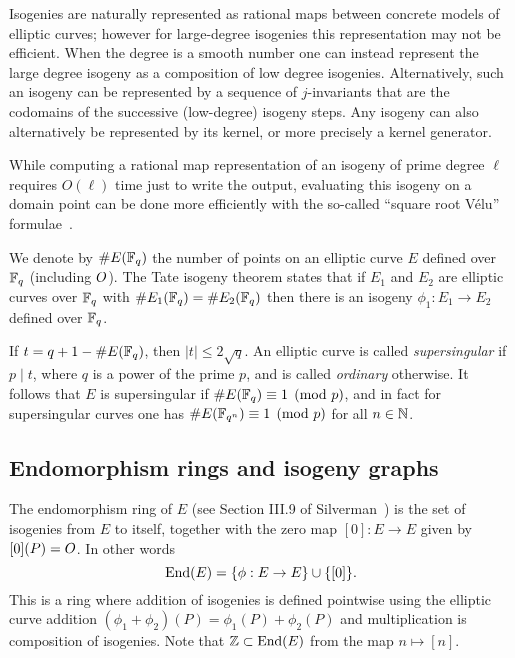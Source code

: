 Isogenies are naturally represented as rational maps between concrete models of elliptic curves; however for large-degree isogenies this representation may not be efficient. When the degree is a smooth number one can instead represent the large degree isogeny as a composition of low degree isogenies.
Alternatively, such an isogeny can be represented by a sequence of $j$-invariants that are the codomains of the successive (low-degree) isogeny steps. 
%
Any isogeny can also alternatively be represented by its kernel, or more precisely a kernel generator. 
%

While computing a rational map representation of an isogeny of prime degree $\ell$ requires $O(\ell)$ time just to write the output, evaluating this isogeny on a domain point can be done more efficiently with the so-called ``square root Vélu'' formulae~\cite{velusqrt}. %



We denote by $\# E( \mathbb{F}_q )$ the number of points on an elliptic curve $E$ defined over $\mathbb{F}_q$ (including $O$).
The Tate isogeny theorem  states that if $E_1$ and $E_2$ are elliptic curves over $\mathbb{F}_q$ with $\#E_1(\mathbb{F}_q) = \#E_2(\mathbb{F}_q)$ then there is an isogeny $\phi_1 : E_1 \rightarrow E_2$ defined over $\mathbb{F}_q$.


If $t = q + 1 - \#E(\mathbb{F}_q )$, then $|t| \le 2 \sqrt{q}$.
An elliptic curve is called \emph{supersingular} if $p \mid t$, where $q$ is a power of the prime $p$, and is called \emph{ordinary} otherwise.
It follows that $E$ is supersingular if $\#E(\mathbb{F}_q ) \equiv 1 \pmod{p} $, and in fact for supersingular curves one has $\#E( \mathbb{F}_{q^n}) \equiv 1 \pmod{p}$ for all $n \in \mathbb{N}$.


\subsection{Endomorphism rings and isogeny graphs}
\label{sec:isog-graph}



The endomorphism ring of $E$ (see Section III.9 of Silverman~\cite{Silverman}) is the set of isogenies from $E$ to itself, together with the zero map $[0] : E \to E$ given by $[0](P) = O$.
In other words
\[
   \text{End}(E)  = \{ \phi : E \to E \} \cup \{ [0] \}.
\]
This is a ring where addition of isogenies is defined pointwise using the elliptic curve addition $(\phi_1 + \phi_2)(P) = \phi_1(P) + \phi_2(P)$ and multiplication is composition of isogenies.
Note that $\mathbb{Z} \subset \text{End}(E)$ from the map $n \mapsto [n]$.


